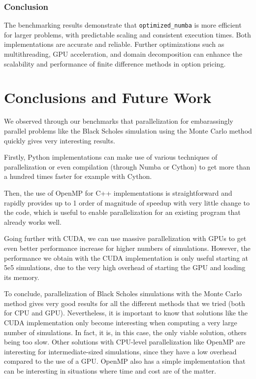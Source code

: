 \documentclass[12pt,a4paper]{report}
\begin{document}
\subsection{Conclusion}

The benchmarking results demonstrate that \texttt{optimized\_numba} is more efficient for larger problems, with predictable scaling and consistent execution times. Both implementations are accurate and reliable. Further optimizations such as multithreading, GPU acceleration, and domain decomposition can enhance the scalability and performance of finite difference methods in option pricing.



\chapter{Conclusions and Future Work}
We observed through our benchmarks that parallelization for embarassingly parallel problems like the Black Scholes simulation using the Monte Carlo method quickly gives very interesting results.

Firstly, Python implementations can make use of various techniques of parallelization or even compilation (through Numba or Cython) to get more than a hundred times faster for example with Cython.

Then, the use of OpenMP for C++ implementations is straightforward and rapidly provides up to 1 order of magnitude of speedup with very little change to the code, which is useful to enable parallelization for an existing program that already works well.

Going further with CUDA, we can use massive parallelization with GPUs to get even better performance increase for higher numbers of simulations. However, the performance we obtain with the CUDA implementation is only useful starting at 5e5 simulations, due to the very high overhead of starting the GPU and loading its memory.

To conclude, parallelization of Black Scholes simulations with the Monte Carlo method gives very good results for all the different methods that we tried (both for CPU and GPU). Nevertheless, it is important to know that solutions like the CUDA implementation only become interesting when computing a very large number of simulations. In fact, it is, in this case, the only viable solution, others being too slow. Other solutions with CPU-level parallelization like OpenMP are interesting for intermediate-sized simulations, since they have a low overhead compared to the use of a GPU. OpenMP also has a simple implementation that can be interesting in situations where time and cost are of the matter.
\end{document}
